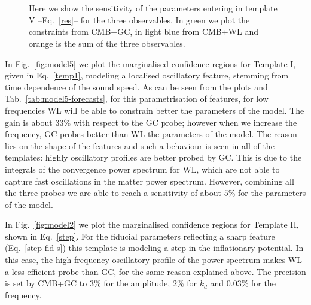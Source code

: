 \documentclass[12pt]{article}
\begin{document}
%
\begin{figure}[hp]
\centering
{}
 \\
 \\
\caption{Here we show the sensitivity of the parameters entering in template V --Eq.~\eqref{res}-- for the three observables. In green we plot the constraints from CMB+GC, in light blue from CMB+WL and orange is the sum of the three observables.}
\label{fig:model3}
\end{figure}
%










In Fig.~\ref{fig:model5} we plot the marginalised confidence regions for Template I, given in Eq.~\eqref{temp1}, modeling a localised oscillatory feature, stemming from time dependence of the sound speed. As can be seen from the plots and Tab.~\ref{tab:model5-forecasts}, for this parametrisation of features, for low frequencies WL will be able to constrain better the parameters of the model. The gain is about $33\%$ with respect to the GC probe; however when we increase the frequency, GC probes better than WL the parameters of the model. 
The reason lies on the shape of the features and such a behaviour is seen in all of the templates: highly oscillatory profiles are better probed by GC. This is due to the integrals of the convergence power spectrum for WL, which are not able to capture fast oscillations in the matter power spectrum. 
However, combining all the three probes we are able to reach a sensitivity of about $5\%$ for the parameters of the model. 

In Fig.~\ref{fig:model2} we plot the marginalised confidence regions for Template II, shown in Eq.~\eqref{step}. For the fiducial parameters reflecting a sharp feature (Eq.~\eqref{step-fid-s}) this template is modeling a step in the inflationary potential. In this case, the high frequency oscillatory profile of the power spectrum makes WL a less efficient probe than GC, for the same reason explained above. The precision is set by CMB+GC to  $3\%$ for the amplitude, $2\%$ for $k_d$ and $0.03\%$ for the frequency.
\end{document}
